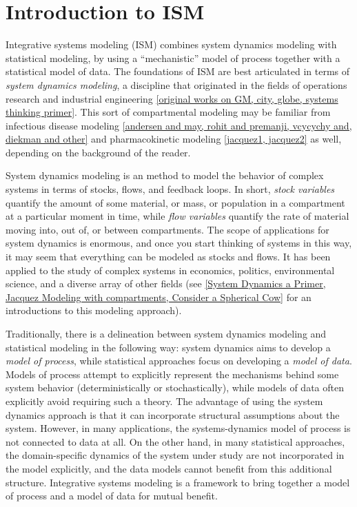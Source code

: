 \section{Introduction to ISM}

Integrative systems modeling (ISM) combines system dynamics modeling
with statistical modeling, by using a ``mechanistic'' model of process
together with a statistical model of data.  The foundations of ISM are
best articulated in terms of \emph{system dynamics modeling}, a
discipline that originated in the fields of operations research and
industrial engineering \ref{original works on GM, city, globe, systems
thinking primer}.  This sort of compartmental modeling may be familiar
from infectious disease modeling \ref{andersen and may, rohit and
premanji, vcycychy and, diekman and other} and pharmacokinetic
modeling \ref{jacquez1, jacquez2} as well, depending on the background
of the reader.

System dynamics modeling is an method to model the behavior of complex
systems in terms of stocks, flows, and feedback loops.  In short,
\emph{stock variables} quantify the amount of some
material, or mass, or population in a compartment at a particular
moment in time, while \emph{flow variables} quantify the rate of
material moving into, out of, or between compartments. The scope of
applications for system dynamics is enormous, and once you start
thinking of systems in this way, it may seem that everything can be
modeled as stocks and flows. It has been
applied to the study of complex systems in economics, politics,
environmental science, and a diverse array of other fields (see
\ref{System Dynamics a Primer, Jacquez Modeling with compartments, Consider a Spherical Cow} for an
introductions to this modeling approach).

Traditionally, there is a delineation between system dynamics modeling
and statistical modeling in the following way: system dynamics aims to
develop a \emph{model of process}, while statistical approaches focus
on developing a \emph{model of data}. Models of process attempt to
explicitly represent the mechanisms behind some system behavior
(deterministically or stochastically), while models of data often
explicitly avoid requiring such a theory. The advantage of using the
system dynamics approach is that it can incorporate structural
assumptions about the system.  However, in many applications, the
systems-dynamics model of process is not connected to data at all.  On
the other hand, in many statistical approaches, the domain-specific
dynamics of the system under study are not incorporated in the model
explicitly, and the data models cannot benefit from this additional
structure.  Integrative systems modeling is a framework to bring
together a model of process and a model of data for mutual benefit.

